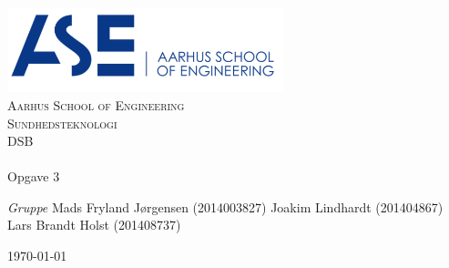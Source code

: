 \begin{titlingpage}
\begin{center}

~ \\[3cm]

\includegraphics[width=0.6\textwidth]{Figurer/ASE}~\\[1cm]

\textsc{\LARGE Aarhus School of Engineering}\\[1.5cm]

\textsc{\Large Sundhedsteknologi}\\
\textsc{\Large DSB }\\[0.5cm]

\noindent\makebox[\linewidth]{\rule{\textwidth}{0.4pt}}\\
[0.5cm]{\Huge Opgave 3}
\noindent\makebox[\linewidth]{\rule{\textwidth}{0.4pt}}

\end{center}

\textit{Gruppe} \newline
Mads Fryland J\o rgensen (2014003827) \newline
Joakim Lindhardt (201404867) \newline
Lars Brandt Holst (201408737)\newline





\vfill

\begin{center}
{\large \today}
\end{center}


\end{titlingpage}
